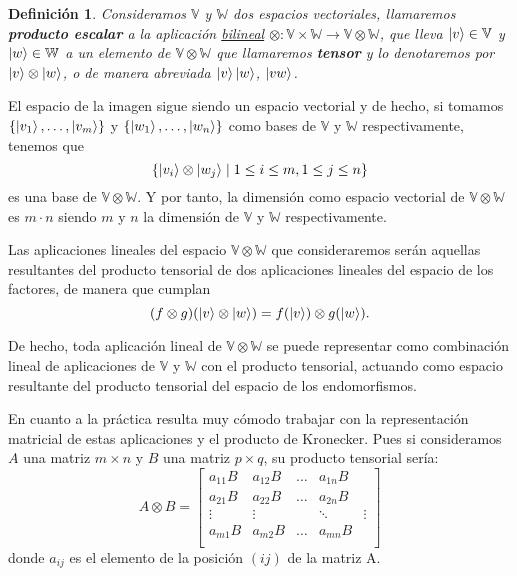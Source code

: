 \documentclass[a4paper]{article}
\newtheorem{deff}{Definición}[section]
\numberwithin{equation}{section}
\begin{document}
\begin{deff}
Consideramos $\mathbb{V}$ y $\mathbb{W}$ dos espacios vectoriales, llamaremos \textbf{producto escalar} a la aplicación \underline{bilineal} $\otimes : \mathbb{V}\times \mathbb{W} \longrightarrow \mathbb{V}\otimes \mathbb{W}$, que lleva $\ket{v} \in \mathbb{V}$ y $\ket{w} \in \mathbb{W}$ a un elemento de $\mathbb{V} \otimes \mathbb{W}$ que llamaremos \textbf{tensor} y lo denotaremos por $\ket{v}\otimes \ket{w}$, o de manera abreviada $\ket{v}\ket{w}$, $\ket{vw}$.
\end{deff}

El espacio de la imagen sigue siendo un espacio vectorial y de hecho, si tomamos $\lbrace \ket{v_1}, \ldots, \ket{v_m} \rbrace$ y $\lbrace \ket{w_1}, \ldots, \ket{w_n} \rbrace$ como bases de $\mathbb{V}$ y $\mathbb{W}$ respectivamente, tenemos que
\begin{equation}
\lbrace \ket{v_i}\otimes\ket{w_j} \mid 1\leq i \leq m, 1\leq j \leq n \rbrace
\end{equation}
es una base de $\mathbb{V}\otimes\mathbb{W}$. Y por tanto, la dimensión como espacio vectorial de $\mathbb{V}\otimes\mathbb{W}$ es $m\cdot n$ siendo $m$ y $n$ la dimensión de $\mathbb{V}$ y $\mathbb{W}$ respectivamente.

Las aplicaciones lineales del espacio $\mathbb{V}\otimes\mathbb{W}$ que consideraremos serán aquellas resultantes del producto tensorial de dos aplicaciones lineales del espacio de los factores, de manera que cumplan
\begin{equation}
(f\otimes g) (\ket{v}\otimes\ket{w}) = f(\ket{v}) \otimes g(\ket{w}).
\end{equation}

De hecho, toda aplicación lineal de $\mathbb{V}\otimes\mathbb{W}$ se puede representar como combinación lineal de aplicaciones de $\mathbb{V}$ y $\mathbb{W}$ con el producto tensorial, actuando como espacio resultante del producto tensorial del espacio de los endomorfismos.

En cuanto a la práctica resulta muy cómodo trabajar con la representación matricial de estas aplicaciones y el producto de Kronecker. Pues si consideramos $A$ una matriz $m\times n$ y $B$ una matriz $p\times q$, su producto tensorial sería:
\begin{equation}
A\otimes B =
\begin{bmatrix}
a_{11}B & a_{12}B & \ldots & a_{1n}B \\
a_{21}B & a_{22}B & \ldots & a_{2n}B \\
\vdots & \vdots & & \ddots & \vdots \\
a_{m1}B & a_{m2}B & \ldots & a_{mn}B \\
\end{bmatrix}
\end{equation}
donde $a_{ij}$ es el elemento de la posición $(ij)$ de la matriz A.
\end{document}
